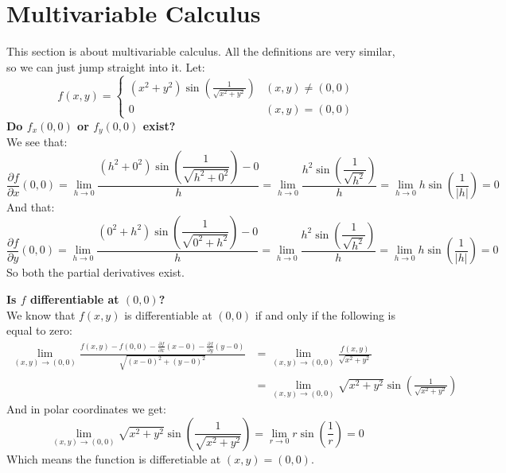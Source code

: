 \documentclass{article}
\theoremstyle{plain}
\begin{document}
	\newpage
	
	\section{Multivariable Calculus}
	
	This section is about multivariable calculus. All the definitions are
	very similar, so we can just jump straight into it. Let:
	\[
		f(x,y) = 
		\begin{cases}
			(x^2+y^2)\sin\left(\frac{1}{\sqrt{x^2+y^2}}\right) 
			& (x,y) \neq (0,0) \\
			0 & (x,y) = (0,0)
		\end{cases}
	\]
	\textbf{Do $f_x(0,0)$ or $f_y(0,0)$ exist?} \\
	We see that:
	\[
		\frac{\partial f}{\partial x}(0,0) = 
		\lim_{h\to 0}
		{\frac{(h^2+0^2)\sin\left(\dfrac{1}{\sqrt{h^2+0^2}}\right) - 0}
		{h}} = 
		\lim_{h\to 0}
		{\frac{h^2\sin\left(\dfrac{1}{\sqrt{h^2}}\right)}{h}} = 
		\lim_{h\to 0}
		{h\sin\left(\frac{1}{\vert h \vert}\right)} = 0
	\]
	And that:
	\[
		\frac{\partial f}{\partial y}(0,0) = 
		\lim_{h\to 0}
		{\frac{(0^2+h^2)\sin\left(\dfrac{1}{\sqrt{0^2+h^2}}\right) - 0}
		{h}} = 
		\lim_{h\to 0}
		{\frac{h^2\sin\left(\dfrac{1}{\sqrt{h^2}}\right)}{h}} = 
		\lim_{h\to 0}
		{h\sin\left(\frac{1}{\vert h \vert}\right)} = 0
	\]
	So both the partial derivatives exist.
	
	\newpage
	
	\textbf{Is $f$ differentiable at $(0,0)$?} \\
	We know that $f(x,y)$ is differentiable at $(0,0)$ if and only
	if the following is equal to zero:
	\begin{align*} 
		\lim_{(x,y)\to (0,0)}
		{\frac{f(x,y) - f(0,0) - \frac{\partial f}{\partial x}(x-0) - 
		\frac{\partial f}{\partial y}(y-0)}{\sqrt{(x-0)^2+(y-0)^2}}} &= 
		\lim_{(x,y)\to (0,0)}
		{\frac{f(x,y)}{\sqrt{x^2+y^2}}} \\ &=
		\lim_{(x,y)\to (0,0)}
		{\sqrt{x^2+y^2}\sin\left(\frac{1}{\sqrt{x^2+y^2}}\right)}
	\end{align*}
	And in polar coordinates we get:
	\[
		\lim_{(x,y)\to (0,0)}
		{\sqrt{x^2+y^2}\sin\left(\frac{1}{\sqrt{x^2+y^2}}\right)} =
		\lim_{r\to 0}
		{r\sin\left(\frac{1}{r}\right)} = 0
	\]
	Which means the function is differetiable at $(x,y) = (0,0)$.
	
	\newpage
	
\end{document}
